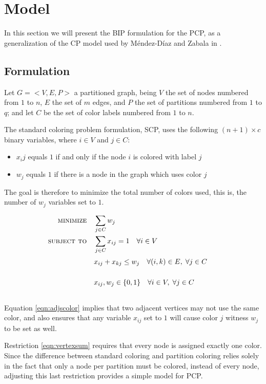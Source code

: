 
\section{Model}

In this section we will present the BIP formulation for the PCP, as a generalization of the CP model used by M\'endez-D\'iaz and Zabala in \cite{mendez2008cutting}.

\subsection{Formulation}

Let $G = <V,E,P>$ a partitioned graph, being $V$ the set of nodes numbered from $1$ to $n$, $E$ the set of $m$ edges, and $P$ the set of partitions numbered from $1$ to $q$; and let $C$ be the set of color labels numbered from $1$ to $n$.

The standard coloring problem formulation, SCP, uses the following $(n + 1) \times c$ binary variables, where $i \in V$ and $j \in C$:
\begin{itemize}
\item $x_ij$ equals $1$ if and only if the node $i$ is colored with label $j$
\item $w_j$ equals $1$ if there is a node in the graph which uses color $j$
\end{itemize}

The goal is therefore to minimize the total number of colors used, this is, the number of $w_j$ variables set to $1$.

\begin{align}
\text{\textsc{minimize}} \quad & \sum_{j \in C} w_j \nonumber \\
\text{\textsc{subject to}} \quad & \sum_{j \in C} x_{ij} = 1 \quad \forall i \in V \label{eqn:vertexsum} \\
& x_{ij} + x_{kj} \leq w_j \quad \forall (i,k) \in E, \; \forall j \in C \sumheight \label{eqn:adjscolor}\\
& x_{ij}, w_{j} \in \{0,1\} \quad \forall i \in V, \; \forall j \in C \sumheight \nonumber
\end{align}

Equation \ref{eqn:adjscolor} implies that two adjacent vertices may not use the same color, and also ensures that any variable $x_{ij}$ set to $1$ will cause color $j$ witness $w_j$ to be set as well.

Restriction \ref{eqn:vertexsum} requires that every node is assigned exactly one color. Since the difference between standard coloring and partition coloring relies solely in the fact that only a node per partition must be colored, instead of every node, adjusting this last restriction provides a simple model for PCP.


